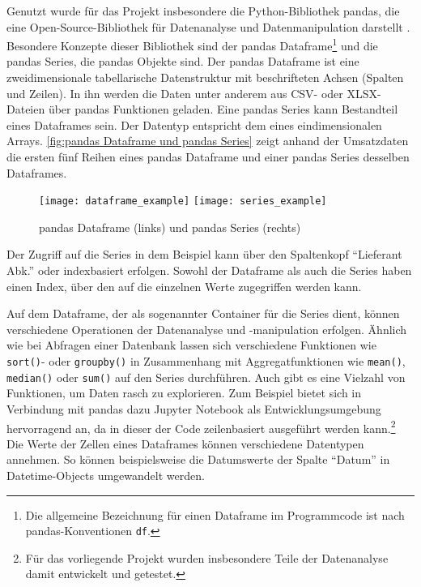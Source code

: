     Genutzt wurde für das Projekt insbesondere die Python-Bibliothek pandas, die eine Open-Source-Bibliothek für Datenanalyse und 
    Datenmanipulation darstellt \cite[vgl.][]{pandas_pandas_2021}. 
    Besondere Konzepte dieser Bibliothek sind der pandas Dataframe\footnote{ Die allgemeine Bezeichnung für einen Dataframe im Programmcode ist nach pandas-Konventionen \texttt{df}.} und die pandas Series, die pandas Objekte sind. Der pandas Dataframe ist eine zweidimensionale 
    tabellarische Datenstruktur mit beschrifteten Achsen (Spalten und Zeilen). In ihn
    werden die Daten unter anderem aus CSV- oder XLSX-Dateien über pandas Funktionen geladen.
    Eine pandas Series kann Bestandteil eines Dataframes sein. Der Datentyp entspricht dem eines eindimensionalen Arrays. 
    \autoref{fig:pandas Dataframe und pandas Series} zeigt anhand der Umsatzdaten die ersten fünf Reihen
    eines pandas Dataframe und einer pandas Series desselben Dataframes. 
    
    
    \begin{figure}[H]
        \centering
            \texttt{[image: dataframe\_example]}
            \hspace{1cm}
            \texttt{[image: series\_example]}
            \caption{pandas Dataframe (links) und pandas Series (rechts)}
            \label{fig:pandas Dataframe und pandas Series}
    \end{figure}

    Der Zugriff auf die Series in dem Beispiel kann über den Spaltenkopf \enquote{Lieferant Abk.} oder indexbasiert erfolgen. 
    Sowohl der Dataframe als auch die Series haben einen Index, über den auf die einzelnen Werte zugegriffen werden kann. 
    
    Auf dem Dataframe, der als sogenannter Container für die Series dient, können verschiedene Operationen der Datenanalyse und 
    -manipulation erfolgen. Ähnlich wie bei Abfragen einer Datenbank lassen sich verschiedene Funktionen wie \texttt{sort()}- oder \texttt{groupby()}
    in Zusammenhang mit Aggregatfunktionen wie \texttt{mean()}, \texttt{median()} oder \texttt{sum()} auf den Series durchführen.
    Auch gibt es eine Vielzahl von Funktionen, um Daten rasch zu explorieren. Zum Beispiel bietet sich in Verbindung mit pandas dazu Jupyter Notebook als
    Entwicklungsumgebung hervorragend an, da in dieser der Code zeilenbasiert ausgeführt werden kann.\footnote{ Für das vorliegende Projekt wurden 
    insbesondere Teile der Datenanalyse damit entwickelt und getestet.} Die Werte der Zellen eines Dataframes können verschiedene Datentypen
    annehmen. So können beispielsweise die Datumswerte der Spalte \enquote{Datum} in Datetime-Objects umgewandelt werden.

